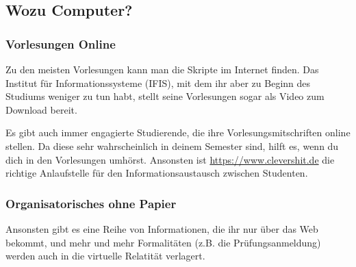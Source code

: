 \subsection{Wozu Computer?}
\subsubsection{Vorlesungen Online}
Zu den meisten Vorlesungen kann man die Skripte im Internet finden. Das Institut 
für Informationssysteme (IFIS), mit dem ihr aber zu Beginn des Studiums 
weniger zu tun habt, stellt seine Vorlesungen sogar als Video zum Download bereit.


Es gibt auch immer engagierte Studierende, die ihre Vorlesungsmitschriften online 
stellen. Da diese sehr wahrscheinlich in deinem Semester sind, hilft es, wenn du dich
in den Vorlesungen umhörst. Ansonsten ist \url{https://www.clevershit.de} die richtige
Anlaufstelle für den Informationsaustausch zwischen Studenten.

\subsubsection{Organisatorisches ohne Papier}
Ansonsten gibt es eine Reihe von Informationen, die ihr nur über das Web bekommt, 
und mehr und mehr Formalitäten (z.B. die Prüfungsanmeldung) werden auch in
die virtuelle Relatität verlagert.

